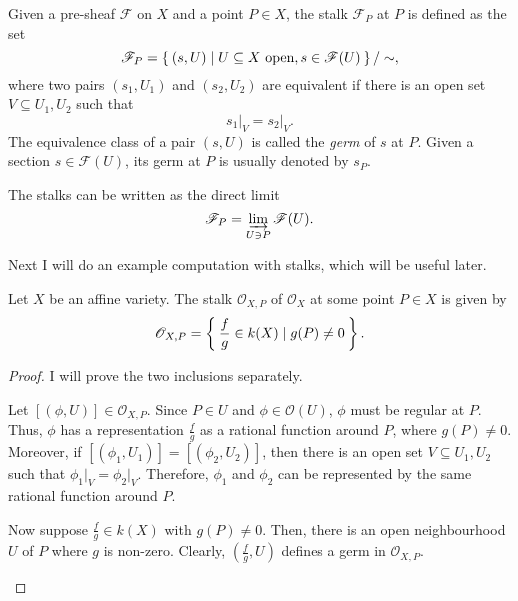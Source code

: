 \begin{defin}
  Given a pre-sheaf $\mathscr{F}$ on $X$ and a point $P\in X$, the stalk
  $\mathscr{F}_{P}$ at $P$ is defined as the set
  \[
    \mathscr{F}_{P}=\Set{(s, U)\mid U\subseteq X\text{ open}, s\in
    \mathscr{F}(U)}/\sim,
  \]
  where two pairs $(s_{1}, U_{1})$ and $(s_{2}, U_{2})$ are equivalent
  if there is an open set $V\subseteq U_{1}, U_{2}$ such that
  \[
    s_{1}\vert_{V}=s_{2}\vert_{V}.
  \]
  The equivalence class of a pair $(s, U)$ is called the \emph{germ}
  of $s$ at $P$. Given a section $s\in\mathscr{F}(U)$, its germ at $P$
  is usually denoted by $s_{P}$.
\end{defin}
\begin{cat}
  The stalks can be written as the direct limit
  \[\mathscr{F}_{P}=\varinjlim_{U\ni P}\mathscr{F}(U).\]
\end{cat}
Next I will do an example computation with stalks, which will be useful
later.
\begin{prop}
  Let $X$ be an affine variety. The stalk $\mathscr{O}_{X,P}$ of
  $\mathscr{O}_{X}$ at some point $P\in X$ is given by
  \[
    \mathscr{O}_{X,P}=\Set{\frac{f}g\in k(X)\mid g(P)\neq 0}.
  \]
\end{prop}
\begin{proof}
  I will prove the two inclusions separately.
  \begin{description}[style=nextline]
    \item[$\subseteq\big)$]
          Let $[(\phi, U)]\in \mathscr{O}_{X,P}$. Since $P\in U$ and
          $\phi\in \mathscr{O}(U)$, $\phi$ must be regular at $P$. Thus,
          $\phi$ has a representation $\frac{f}g$ as a rational function
          around $P$, where $g(P)\neq 0$. Moreover, if $[(\phi_{1}, U_{1})]
          =[(\phi_{2}, U_{2})]$, then there is an open set $V\subseteq
          U_{1},U_{2}$ such that $\phi_{1}\vert_{V}=\phi_{2}\vert_{V}$.
          Therefore, $\phi_{1}$ and $\phi_{2}$ can be represented by the
          same rational function around $P$.
    \item[$\supseteq\big)$]
          Now suppose $\frac{f}g\in k(X)$ with $g(P)\neq 0$. Then, there
          is an open neighbourhood $U$ of $P$ where $g$ is non-zero.
          Clearly, $(\frac{f}g, U)$ defines a germ in $\mathscr{O}_{X,P}$.
  \end{description}
\end{proof}

